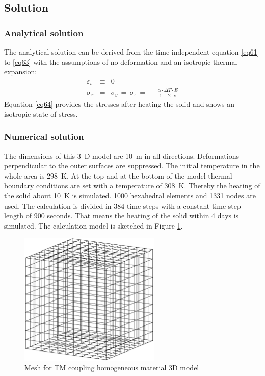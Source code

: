 \subsection{Solution}
\subsubsection{Analytical solution}
The analytical solution can be derived from the time independent equation \eqref{eq61} to \eqref{eq63} with the assumptions of no deformation and an isotropic thermal expansion:
\begin{eqnarray}
\varepsilon_i & \equiv & 0 \nonumber \\[1.5ex]
\sigma_x & = & \sigma_y\,=\,\sigma_z\,=\,
-\frac{\alpha\cdot\Delta T\cdot E}{1-2\cdot\nu}
\label{eq64}
\end{eqnarray}
Equation \eqref{eq64} provides the stresses after heating the solid and shows an isotropic state of stress.

\subsubsection{Numerical solution}
The dimensions of this 3~D-model are 10~m in all directions. Deformations perpendicular to the outer surfaces are suppressed. The initial temperature in the whole area is 298~K. At the top and at the bottom of the model thermal boundary conditions are set with a temperature of 308~K. Thereby the heating of the solid about 10~K is simulated. 1000 hexahedral elements and 1331 nodes are used. The calculation is divided in 384 time steps with a constant time step length of 900 seconds. That means the heating of the solid within 4 days is simulated. The calculation model is sketched in Figure \ref{fig62}.


\begin{figure}[htbp]
\centering
\includegraphics[width=0.6\textwidth]{PART_III/TM/figures/fig62}
\caption{Mesh for TM coupling homogeneous material 3D model}
\label{fig62}
\end{figure}

